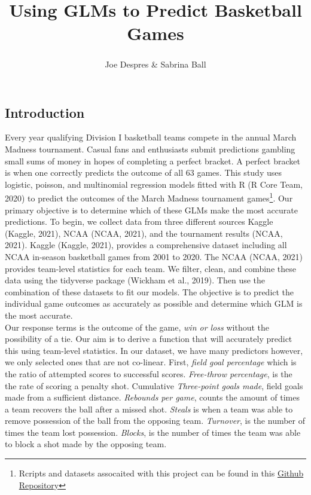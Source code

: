 \documentclass[
  english,
  man,floatsintext]{apa6}
\title{Using GLMs to Predict Basketball Games}
\author{Joe Despres\textsuperscript{} \& Sabrina Ball\textsuperscript{}}
\date{}
\affiliation{\vspace{0.5cm}\textsuperscript{} Michigan State University}
\begin{document}
\maketitle

\hypertarget{introduction}{%
\subsection{Introduction}\label{introduction}}

Every year qualifying Division I basketball teams compete in the annual March Madness tournament. Casual fans and enthusiasts submit predictions gambling small sums of money in hopes of completing a perfect bracket. A perfect bracket is when one correctly predicts the outcome of all 63 games. This study uses logistic, poisson, and multinomial regression models fitted with R (R Core Team, 2020) to predict the outcomes of the March Madness tournament games\footnote{Rcripts and datasets assocaited with this project can be found in this \href{https://github.com/despresj/March-Madness}{Github Repository}}. Our primary objective is to determine which of these GLMs make the most accurate predictions. To begin, we collect data from three different sources Kaggle (Kaggle, 2021), NCAA (NCAA, 2021), and the tournament results (NCAA, 2021). Kaggle (Kaggle, 2021), provides a comprehensive dataset including all NCAA in-season basketball games from 2001 to 2020. The NCAA (NCAA, 2021) provides team-level statistics for each team. We filter, clean, and combine these data using the tidyverse package (Wickham et al., 2019). Then use the combination of these datasets to fit our models. The objective is to predict the individual game outcomes as accurately as possible and determine which GLM is the most accurate.\\
Our response terms is the outcome of the game, \emph{win or loss} without the possibility of a tie. Our aim is to derive a function that will accurately predict this using team-level statistics. In our dataset, we have many predictors however, we only selected ones that are not co-linear. First, \emph{field goal percentage} which is the ratio of attempted scores to successful scores. \emph{Free-throw percentage}, is the the rate of scoring a penalty shot. Cumulative \emph{Three-point goals made}, field goals made from a sufficient distance. \emph{Rebounds per game}, counts the amount of times a team recovers the ball after a missed shot. \emph{Steals} is when a team was able to remove possession of the ball from the opposing team. \emph{Turnover}, is the number of times the team lost possession. \emph{Blocks}, is the number of times the team was able to block a shot made by the opposing team.\\
\end{document}
